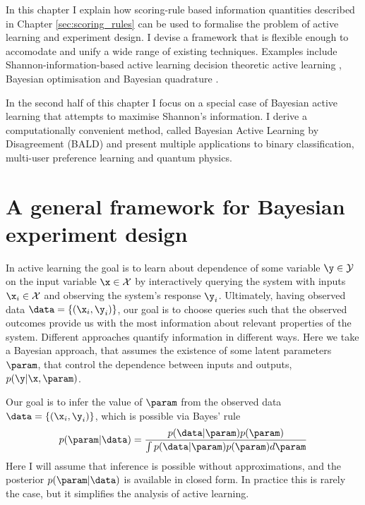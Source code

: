 In this chapter I explain how scoring-rule based information quantities described in Chapter \ref{sec:scoring_rules} can be used to formalise the problem of active learning and experiment design. I devise a framework that is flexible enough to accomodate and unify a wide range of existing techniques. Examples include Shannon-information-based active learning \citep{Krause2006,MacKay1992,Houlsby2011} decision theoretic active learning \citep{Kapoor2007,Zhu2003active}, Bayesian optimisation \citep{Hennig2012entropy,Hennig2012newton} and Bayesian quadrature \citep{BZHermiteQuadrature,BZMonteCarlo}.

In the second half of this chapter I focus on a special case of Bayesian active learning that attempts to maximise Shannon's information. I derive a computationally convenient method, called Bayesian Active Learning by Disagreement (BALD) and present multiple applications to binary classification, multi-user preference learning and quantum physics.

\section{A general framework for Bayesian experiment design}

In active learning the goal is to learn about dependence of some variable $\y\in\mathcal{Y}$ on the input variable $\x\in\mathcal{X}$ by interactively querying the system with inputs $\x_i\in\mathcal{X}$ and observing the system's response $\y_i$. Ultimately, having observed data $\data = \{(\x_i,\y_i)\}$, our goal is to choose queries such that the observed outcomes provide us with the most information about relevant properties of the system. Different approaches quantify information in different ways. Here we take a Bayesian approach, that assumes the existence of some latent parameters $\param$, that control the dependence between inputs and outputs, $p(\y\vert\x,\param)$.

Our goal is to infer the value of $\param$ from the observed data $\data = \{(\x_i,\y_i)\}$, which is possible via Bayes' rule
\begin{equation}
p(\param\vert\data) = \frac{p(\data\vert\param)p(\param)}{\int p(\data\vert\param)p(\param) d\param}
\end{equation}
Here I will assume that inference is possible without approximations, and the posterior $p(\param\vert\data)$ is available in closed form. In practice this is rarely the case, but it simplifies the analysis of active learning.

